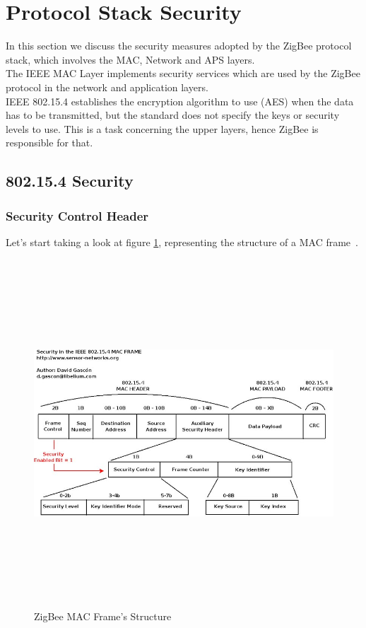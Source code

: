 \documentclass[12pt]{report}
\begin{document}
{\clearpage
\section{Protocol Stack Security}
\bigskip
In this section we discuss the security measures adopted by the ZigBee protocol stack, which involves the MAC, Network and APS layers.\\

The IEEE MAC Layer implements security services which are used by the ZigBee protocol in the network and application layers.\\ 
IEEE 802.15.4 establishes the encryption algorithm to use (AES) when the data has to be transmitted, but the standard does not specify the keys or security levels to use.
This is a task concerning the upper layers, hence ZigBee is responsible for that.

\subsection{802.15.4 Security}
\bigskip

\subsubsection{Security Control Header}
\bigskip
Let's start taking a look at figure \ref{fig:zigbeemacframestruc}, representing the structure of a MAC frame~\cite{security802154}.\\

\begin{figure}[H]
\includegraphics[width=13cm,height=13cm,keepaspectratio]{mac_frame}
\centering
\caption{ZigBee MAC Frame's Structure}
\label{fig:zigbeemacframestruc}
\end{figure}

}
\end{document}
